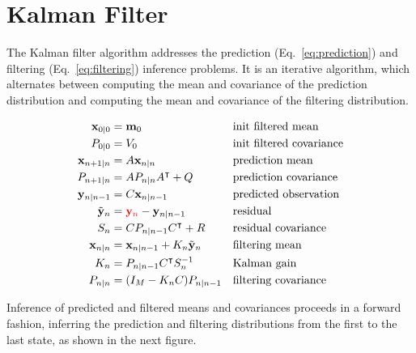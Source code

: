 \documentclass[12pt]{article}
\begin{document}
\section{Kalman Filter}

The Kalman filter algorithm addresses the prediction (Eq.~\ref{eq:prediction})
and filtering (Eq.~\ref{eq:filtering}) inference problems.
%
It is an iterative algorithm, which alternates between computing the mean and
covariance of the prediction distribution and computing the mean and covariance
of the filtering distribution.

\begin{alignat*}{2}
    \mathbf{x}_{0|0}&=\mathbf{m}_0&&\text{init filtered mean}\\
    P_{0|0}&=V_0&&\text{init filtered covariance}\\
    \mathbf{x}_{n+1|n}&=A\mathbf{x}_{n|n}\quad&&\text{prediction mean}\\
    P_{n+1|n}&=AP_{n|n}A^\intercal+Q\quad&&\text{prediction covariance}\\
    \mathbf{y}_{n|n-1}&=C\mathbf{x}_{n|n-1}\quad&&\text{predicted observation}\\
    \tilde{\mathbf{y}}_n&=\textcolor{red}{\mathbf{y}_n}-\mathbf{y}_{n|n-1}\quad&&\text{residual}\\
    S_n&=CP_{n|n-1}C^\intercal+R\quad&&\text{residual covariance}\\
    \mathbf{x}_{n|n}&=\mathbf{x}_{n|n-1}+K_n\tilde{\mathbf{y}}_n\quad&&\text{filtering mean}\\
    K_n&=P_{n|n-1}C^\intercal S_n^{-1}&&\text{Kalman gain}\\
    P_{n|n}&=(I_M-K_nC)P_{n|n-1}&&\text{filtering covariance}
\end{alignat*}

Inference of predicted and filtered means and covariances proceeds in a forward
fashion, inferring the prediction and filtering distributions from the first to
the last state, as shown in the next figure.
\end{document}
